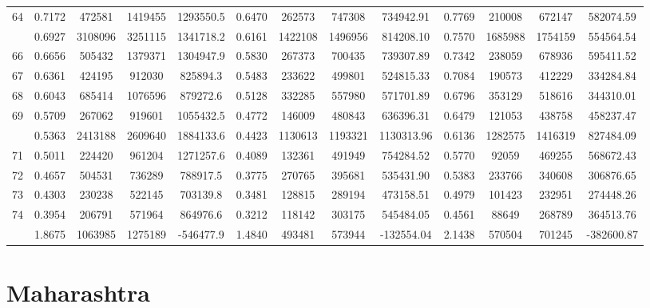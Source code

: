 \documentclass[
  12pt,
]{article}
\begin{document}
\begin{longtable}[t]{lcccccccccccc}
64 & 0.7172 & 472581 & 1419455 & 1293550.5 & 0.6470 & 262573 & 747308 & 734942.91 & 0.7769 & 210008 & 672147 & 582074.59\\
\addlinespace
65 & 0.6927 & 3108096 & 3251115 & 1341718.2 & 0.6161 & 1422108 & 1496956 & 814208.10 & 0.7570 & 1685988 & 1754159 & 554564.54\\
66 & 0.6656 & 505432 & 1379371 & 1304947.9 & 0.5830 & 267373 & 700435 & 739307.89 & 0.7342 & 238059 & 678936 & 595411.52\\
67 & 0.6361 & 424195 & 912030 & 825894.3 & 0.5483 & 233622 & 499801 & 524815.33 & 0.7084 & 190573 & 412229 & 334284.84\\
68 & 0.6043 & 685414 & 1076596 & 879272.6 & 0.5128 & 332285 & 557980 & 571701.89 & 0.6796 & 353129 & 518616 & 344310.01\\
69 & 0.5709 & 267062 & 919601 & 1055432.5 & 0.4772 & 146009 & 480843 & 636396.31 & 0.6479 & 121053 & 438758 & 458237.47\\
\addlinespace
70 & 0.5363 & 2413188 & 2609640 & 1884133.6 & 0.4423 & 1130613 & 1193321 & 1130313.96 & 0.6136 & 1282575 & 1416319 & 827484.09\\
71 & 0.5011 & 224420 & 961204 & 1271257.6 & 0.4089 & 132361 & 491949 & 754284.52 & 0.5770 & 92059 & 469255 & 568672.43\\
72 & 0.4657 & 504531 & 736289 & 788917.5 & 0.3775 & 270765 & 395681 & 535431.90 & 0.5383 & 233766 & 340608 & 306876.65\\
73 & 0.4303 & 230238 & 522145 & 703139.8 & 0.3481 & 128815 & 289194 & 473158.51 & 0.4979 & 101423 & 232951 & 274448.26\\
74 & 0.3954 & 206791 & 571964 & 864976.6 & 0.3212 & 118142 & 303175 & 545484.05 & 0.4561 & 88649 & 268789 & 364513.76\\
\addlinespace
75 & 1.8675 & 1063985 & 1275189 & -546477.9 & 1.4840 & 493481 & 573944 & -132554.04 & 2.1438 & 570504 & 701245 & -382600.87\\*
\end{longtable}
\endgroup{}

\pagebreak

\hypertarget{maharashtra}{%
\section{Maharashtra}\label{maharashtra}}

\begingroup\fontsize{9.7}{11.7}\selectfont
\end{document}
